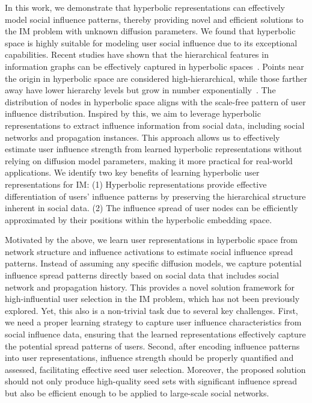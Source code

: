 In this work, we demonstrate that hyperbolic representations can effectively model social influence patterns, thereby providing novel and efficient solutions to the IM problem with unknown diffusion parameters.
We found that hyperbolic space is highly suitable for modeling user social influence due to its exceptional capabilities.  
Recent studies have shown that the hierarchical features in information graphs can be effectively captured in hyperbolic spaces~\cite{nickel2017poincare, nickel2018_hype_geo, ICML2023_Yang}.
Points near the origin in hyperbolic space are considered high-hierarchical, while those farther away have lower hierarchy levels but grow in number exponentially~\cite{TPAMI2021_peng_survey}.
The distribution of nodes in hyperbolic space aligns with the scale-free pattern of user influence distribution.
Inspired by this, we aim to leverage hyperbolic representations to extract influence information from social data, including social networks and propagation instances.
% 
This approach allows us to effectively estimate user influence strength from learned hyperbolic representations without relying on diffusion model parameters, making it more practical for real-world applications.
We identify two key benefits of learning hyperbolic user representations for IM: (1) Hyperbolic representations provide effective differentiation of users' influence patterns by preserving the hierarchical structure inherent in social data. (2) The influence spread of user nodes can be efficiently approximated by their positions within the hyperbolic embedding space.

Motivated by the above, we learn user representations in hyperbolic space from network structure and influence activations to estimate social influence spread patterns.
Instead of assuming any specific diffusion models, we capture potential influence spread patterns directly based on social data that includes social network and propagation history.
This provides a novel solution framework for high-influential user selection in the IM problem, which has not been previously explored.
Yet, this also is a non-trivial task due to several key challenges.
First, we need a proper learning strategy to capture user influence characteristics from social influence data, ensuring that the learned representations effectively capture the potential spread patterns of users.
Second, after encoding influence patterns into user representations, influence strength should be properly quantified and assessed, facilitating effective seed user selection.
Moreover, the proposed solution should not only produce high-quality seed sets with significant influence spread but also be efficient enough to be applied to large-scale social networks.

